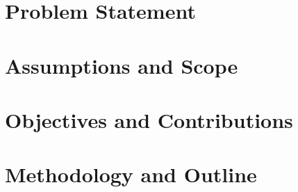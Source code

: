 
\section{Problem Statement}





\section{Assumptions and Scope}



\section{Objectives and Contributions}


\section{Methodology and Outline}

